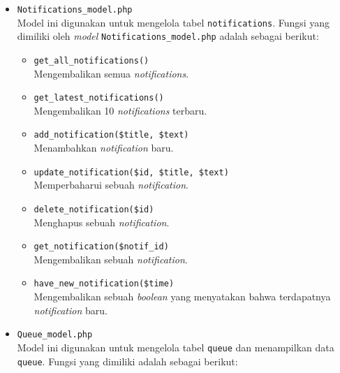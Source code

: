 \documentclass[a4paper,twoside]{article}
\begin{document}
\begin{enumerate}
\begin{itemize}
\begin{itemize}
			                  \vspace{0.5cm}
			            \item \verb|Notifications_model.php| \\
			                  Model ini digunakan untuk mengelola tabel \verb|notifications|. Fungsi yang dimiliki oleh \textit{model} \verb|Notifications_model.php| adalah sebagai berikut:

			                  \begin{itemize}
				                  \item \verb|get_all_notifications()| \\
				                        Mengembalikan semua \textit{notifications}.
				                  \item \verb|get_latest_notifications()| \\
				                        Mengembalikan 10 \textit{notifications} terbaru.
				                  \item \verb|add_notification($title, $text)| \\
				                        Menambahkan \textit{notification} baru.
				                  \item \verb|update_notification($id, $title, $text)| \\
				                        Memperbaharui sebuah \textit{notification}.
				                  \item \verb|delete_notification($id)| \\
				                        Menghapus sebuah \textit{notification}.
				                  \item \verb|get_notification($notif_id)| \\
				                        Mengembalikan sebuah \textit{notification}.
				                  \item \verb|have_new_notification($time)| \\
				                        Mengembalikan sebuah \textit{boolean} yang menyatakan bahwa terdapatnya \textit{notification} baru.
			                  \end{itemize}

			                  \vspace{0.5cm}
			            \item \verb|Queue_model.php| \\
			                  Model ini digunakan untuk mengelola tabel \verb|queue| dan menampilkan data \verb|queue|. Fungsi yang dimiliki adalah sebagai berikut:


\end{itemize}
\end{itemize}
\end{enumerate}
\end{document}
